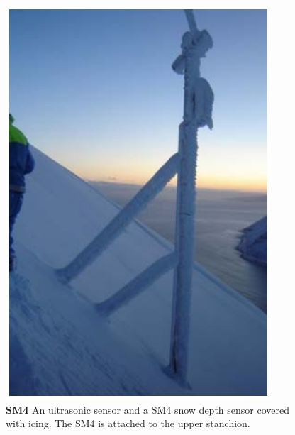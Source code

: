  \begin{figure}[!t]
    \centering
    \includegraphics[width=0.8\linewidth]{figures/SM4.JPG}
    \caption{\textbf{SM4}  An ultrasonic sensor and a SM4 snow depth sensor covered with icing. The SM4 is attached to the upper stanchion.}
    \label{fig:SM4}
 \end{figure}
 
